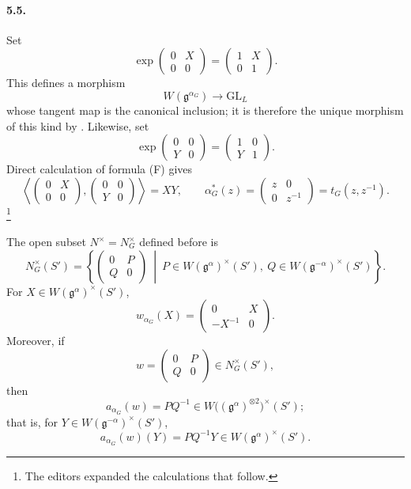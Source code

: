 \paragraph{\textbf{5.5.}}
Set
\[
 \exp\begin{pmatrix}0&X\\0&0\end{pmatrix}
   =\begin{pmatrix}1&X\\0&1\end{pmatrix}.
\]
This defines a morphism
\[
 W(\mathfrak g^{\alpha_G})\longrightarrow\mathrm{GL}_L
\]
whose tangent map is the canonical inclusion; it is therefore the
unique morphism of this kind by .  Likewise, set
\[
 \exp\begin{pmatrix}0&0\\Y&0\end{pmatrix}
   =\begin{pmatrix}1&0\\Y&1\end{pmatrix}.
\]
Direct calculation of formula \textup{(F)} gives
\[
 \left\langle
 \begin{pmatrix}0&X\\0&0\end{pmatrix},
 \begin{pmatrix}0&0\\Y&0\end{pmatrix}
 \right\rangle
 =XY,
 \qquad
 \alpha_G^\ast(z)
 =\begin{pmatrix}z&0\\0&z^{-1}\end{pmatrix}
 =t_G(z,z^{-1}).
\]
\footnote{The editors expanded the calculations that follow.}

The open subset \(N^\times=N_G^\times\) defined before  is
\[
 N_G^\times(S')
 =
 \left\{
 \begin{pmatrix}0&P\\Q&0\end{pmatrix}
 \ \middle|\
 P\in W(\mathfrak g^\alpha)^\times(S'),\
 Q\in W(\mathfrak g^{-\alpha})^\times(S')
 \right\}.
\]
For \(X\in W(\mathfrak g^\alpha)^\times(S')\),
\[
 w_{\alpha_G}(X)
 =\begin{pmatrix}0&X\\-X^{-1}&0\end{pmatrix}.
\]
Moreover, if
\[
 w=\begin{pmatrix}0&P\\Q&0\end{pmatrix}\in N_G^\times(S'),
\]
then
\[
 a_{\alpha_G}(w)=PQ^{-1}
   \in W\bigl((\mathfrak g^\alpha)^{\otimes2}\bigr)^\times(S');
\]
that is, for \(Y\in W(\mathfrak g^{-\alpha})^\times(S')\),
\[
 a_{\alpha_G}(w)(Y)=PQ^{-1}Y
   \in W(\mathfrak g^\alpha)^\times(S').
\]

